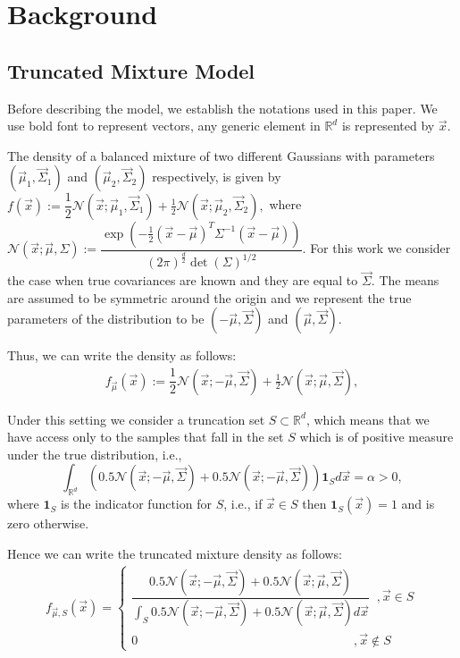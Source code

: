 \section{Background}

\subsection{Truncated Mixture Model}\label{sec:model}
Before describing the model, we establish the notations used in this paper. We use bold font to represent vectors, any generic element in $\mathbb{R}^d$ is represented by $\vec{x}$.

The density of a balanced mixture of two different Gaussians with parameters $\left(\vec{\mu}_1,\vec{\Sigma}_1\right)$ and  $\left(\vec{\mu}_2,\vec{\Sigma}_2\right)$ respectively, is given by
$f(\vec{x}) := \dfrac{1}{2}\mathcal{N}(\vec{x};\vec{\mu}_1,\vec{\Sigma}_1)+\frac{1}{2}\mathcal{N}(\vec{x};\vec{\mu}_2,\vec{\Sigma}_2),$ where $\mathcal{N}(\vec{x};\vec{\mu},\Sigma) := \dfrac{\exp(-\frac{1}{2}(\vec{x}-\vec{\mu})^T\Sigma^{-1}(\vec{x}-\vec{\mu}))}{(2\pi)^{\frac{d}{2}}\det(\Sigma)^{1/2}}$. For this work we consider the case when true covariances are known and they are equal to $\vec{\Sigma}$. The means are assumed to be symmetric around the origin and we represent the true parameters of the distribution to be $\left(-\vec{\mu},\vec{\Sigma}\right)$ and $\left(\vec{\mu},\vec{\Sigma}\right)$.

Thus, we can write the density as follows:
\begin{align}\label{eq:density_simple}
f_{\vec{\mu}}(\vec{x}) := \dfrac{1}{2}\mathcal{N}(\vec{x};-\vec{\mu},\vec{\Sigma})+\frac{1}{2}\mathcal{N}(\vec{x};\vec{\mu},\vec{\Sigma}),
\end{align}

Under this setting we consider a truncation set $S \subset \mathbb{R}^d$, which means that we have access only to the samples that fall in the set $S$ which is of positive measure under the true distribution, i.e., \[\int_{\mathbb{R}^d} (0.5\mathcal{N}(\vec{x};-\vec{\mu},\vec{\Sigma})+0.5\mathcal{N}(\vec{x};-\vec{\mu},\vec{\Sigma}))\mathbf{1}_{S}d\vec{x}= \alpha > 0,\] where $\mathbf{1}_{S}$ is the indicator function for $S$, i.e., if $\vec{x} \in S$ then $\mathbf{1}_{S}(\vec{x})=1$ and is zero otherwise.

Hence we can write the truncated mixture density as follows:
\begin{align}
f_{\vec{\mu},S}(\vec{x})={
	\begin{cases}
	\dfrac{0.5\mathcal{N}(\vec{x};-\vec{\mu},\vec{\Sigma})+0.5\mathcal{N}(\vec{x};\vec{\mu},\vec{\Sigma})}{\int_{S}0.5\mathcal{N}(\vec{x};-\vec{\mu},\vec{\Sigma})+0.5\mathcal{N}(\vec{x};\vec{\mu},\vec{\Sigma}) d\vec{x}} \;\;, \vec{x} \in S\\
	0                                              \qquad\qquad\qquad\qquad\qquad\quad\qquad\qquad\qquad\;, \vec{x} \notin S
	\end{cases}
}
\end{align}

